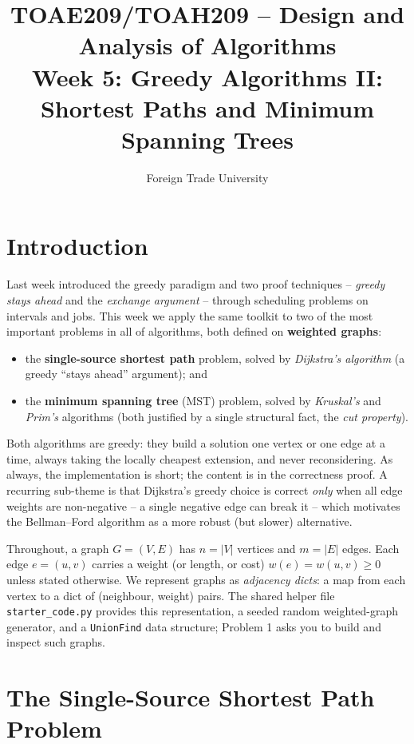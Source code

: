 \documentclass[11pt]{article}
\title{TOAE209/TOAH209 -- Design and Analysis of Algorithms\\[4pt]
\large Week 5: Greedy Algorithms II: Shortest Paths and Minimum Spanning Trees}
\author{Foreign Trade University}
\date{}
\begin{document}
\maketitle
\tableofcontents

\section{Introduction}

Last week introduced the greedy paradigm and two proof techniques --
\emph{greedy stays ahead} and the \emph{exchange argument} -- through scheduling
problems on intervals and jobs. This week we apply the same toolkit to two of
the most important problems in all of algorithms, both defined on
\textbf{weighted graphs}:

\begin{itemize}
    \item the \textbf{single-source shortest path} problem, solved by
    \emph{Dijkstra's algorithm} (a greedy ``stays ahead'' argument); and
    \item the \textbf{minimum spanning tree} (MST) problem, solved by
    \emph{Kruskal's} and \emph{Prim's} algorithms (both justified by a single
    structural fact, the \emph{cut property}).
\end{itemize}

Both algorithms are greedy: they build a solution one vertex or one edge at a
time, always taking the locally cheapest extension, and never reconsidering.
As always, the implementation is short; the content is in the correctness
proof. A recurring sub-theme is that Dijkstra's greedy choice is correct
\emph{only} when all edge weights are non-negative -- a single negative edge can
break it -- which motivates the Bellman--Ford algorithm as a more robust (but
slower) alternative.

Throughout, a graph $G = (V, E)$ has $n = |V|$ vertices and $m = |E|$ edges.
Each edge $e = (u,v)$ carries a weight (or length, or cost) $w(e) = w(u,v) \ge
0$ unless stated otherwise. We represent graphs as \emph{adjacency dicts}: a map
from each vertex to a dict of (neighbour, weight) pairs. The shared helper file
\texttt{starter\_code.py} provides this representation, a seeded random
weighted-graph generator, and a \texttt{UnionFind} data structure; Problem 1
asks you to build and inspect such graphs.

\section{The Single-Source Shortest Path Problem}
\end{document}
